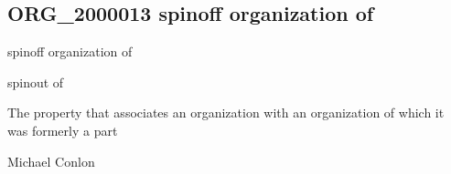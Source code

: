 \documentclass[letterpaper,10pt,english]{sphinxmanual}
\begin{document}
\subsection{ORG\_2000013 \sphinxhyphen{} spin\sphinxhyphen{}off organization of}
\label{\detokenize{doc-ORG_2000013:org-2000013-spin-off-organization-of}}\label{\detokenize{doc-ORG_2000013:index-0}}\label{\detokenize{doc-ORG_2000013::doc}}
\begin{sphinxShadowBox}

\sphinxAtStartPar
spin\sphinxhyphen{}off organization of
\end{sphinxShadowBox}

\begin{sphinxShadowBox}

\sphinxAtStartPar
spinout of
\end{sphinxShadowBox}

\begin{sphinxShadowBox}

\sphinxAtStartPar
{}
\end{sphinxShadowBox}

\begin{sphinxShadowBox}

\sphinxAtStartPar
The property that associates an organization with an organization of which it was formerly a part
\end{sphinxShadowBox}

\begin{sphinxShadowBox}

\sphinxAtStartPar
Michael Conlon 
\end{sphinxShadowBox}

\begin{sphinxShadowBox}

\sphinxAtStartPar
{\hyperref[\detokenize{doc-ORG_0000001::doc}]{}}
\end{sphinxShadowBox}

\begin{sphinxShadowBox}

\sphinxAtStartPar
{\hyperref[\detokenize{doc-ORG_0000001::doc}]{}}
\end{sphinxShadowBox}
\end{document}
